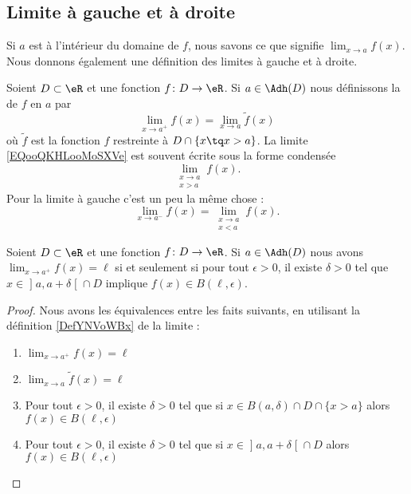\subsection{Limite à gauche et à droite}

Si \( a\) est à l'intérieur du domaine de \( f\), nous savons ce que signifie \( \lim_{x\to a} f(x)\). Nous donnons également une définition des limites à gauche et à droite.

\begin{definition}
    Soient \( D\subset \eR\) et une fonction \( f\colon D\to \eR\). Si \( a\in \Adh(D)\) nous définissons la  de \( f\) en \( a\) par
    \begin{equation}        \label{EQooQKHLooMoSXVe}
        \lim_{x\to a^+} f(x)=\lim_{x\to a} \tilde f(x)
    \end{equation}
    où \( \tilde f\) est la fonction \( f\) restreinte à \( D\cap\{ x\tq x>a \}\). La limite \eqref{EQooQKHLooMoSXVe} est souvent écrite sous la forme condensée
    \begin{equation}
        \lim_{\substack{x\to a\\x>a}}f(x).
    \end{equation}
    Pour la limite à gauche c'est un peu la même chose :
    \begin{equation}
        \lim_{x\to a^-} f(x)=\lim_{\substack{x\to a\\x<a}}f(x).
    \end{equation}
\end{definition}

\begin{lemma}       \label{LEMooXJMFooCkzoVi}
Soient \( D\subset \eR\) et une fonction \( f\colon D\to \eR\). Si \( a\in \Adh(D)\) nous avons \( \lim_{x\to a^+} f(x)=\ell\) si et seulement si pour tout \( \epsilon>0\), il existe \( \delta>0\) tel que  \( x\in\mathopen] a , a+\delta \mathclose[\cap D\) implique \( f(x)\in B(\ell,\epsilon)\).
\end{lemma}

\begin{proof}
    Nous avons les équivalences entre les faits suivants, en utilisant la définition \ref{DefYNVoWBx} de la limite :
    \begin{enumerate}
        \item
            \( \lim_{x\to a^+} f(x)=\ell\)
        \item
            \( \lim_{x\to a} \tilde f(x)=\ell\)
        \item
            Pour tout \( \epsilon>0\), il existe \( \delta>0\) tel que si \( x\in B(a,\delta)\cap D\cap\{ x>a \}\) alors \( f(x)\in B(\ell,\epsilon)\)
        \item
        Pour tout \( \epsilon>0\), il existe \( \delta>0\) tel que si \( x\in \mathopen] a , a+\delta \mathclose[\cap D\) alors \( f(x)\in B(\ell,\epsilon)\)
    \end{enumerate}
\end{proof}

